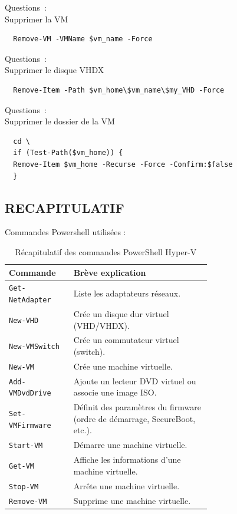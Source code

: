 Questions~: \\
Supprimer la VM

\begin{verbatim}
  Remove-VM -VMName $vm_name -Force
\end{verbatim}

\vspace{0.5cm}

Questions~: \\
Supprimer le disque VHDX
\begin{verbatim}
  Remove-Item -Path $vm_home\$vm_name\$my_VHD -Force
\end{verbatim}

\vspace{0.5cm}

Questions~: \\
Supprimer le dossier de la VM
\begin{verbatim}
  cd \
  if (Test-Path($vm_home)) {
  Remove-Item $vm_home -Recurse -Force -Confirm:$false
  }
\end{verbatim}

\newpage

\subsection*{RECAPITULATIF}
{}
\noindent Commandes Powershell utilisées :

\begin{table}[ht]
\centering
\begin{tabular}{|l|p{0.68\linewidth}|}
\hline
\textbf{Commande} & \textbf{Brève explication} \\ \hline
\texttt{Get-NetAdapter} & Liste les adaptateurs réseaux. \\ \hline
\texttt{New-VHD} & Crée un disque dur virtuel (VHD/VHDX). \\ \hline
\texttt{New-VMSwitch} & Crée un commutateur virtuel (switch). \\ \hline
\texttt{New-VM} & Crée une machine virtuelle. \\ \hline
\texttt{Add-VMDvdDrive} & Ajoute un lecteur DVD virtuel ou associe une image ISO. \\ \hline
\texttt{Set-VMFirmware} & Définit des paramètres du firmware (ordre de démarrage, SecureBoot, etc.). \\ \hline
\texttt{Start-VM} & Démarre une machine virtuelle. \\ \hline
\texttt{Get-VM} & Affiche les informations d'une machine virtuelle. \\ \hline
\texttt{Stop-VM} & Arrête une machine virtuelle. \\ \hline
\texttt{Remove-VM} & Supprime une machine virtuelle. \\ \hline
\end{tabular}
\caption{Récapitulatif des commandes PowerShell Hyper-V}
\end{table}

